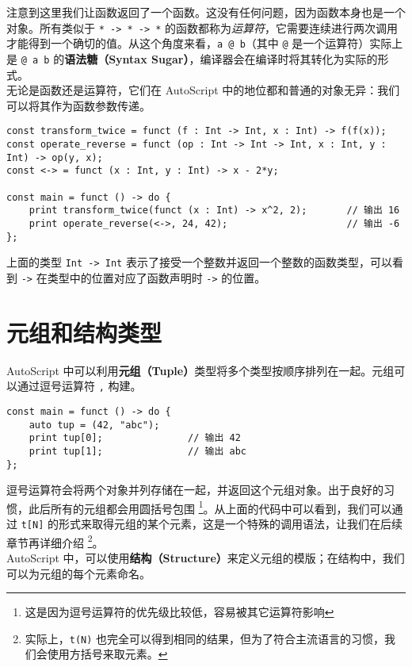 注意到这里我们让函数返回了一个函数。这没有任何问题，因为函数本身也是一个对象。所有类似于 \lstinline!* -> * -> *! 的函数都称为\emph{运算符}，它需要连续进行两次调用才能得到一个确切的值。从这个角度来看，\lstinline!a @ b!（其中 \lstinline!@! 是一个运算符）实际上是 \lstinline!@ a b! 的\textbf{语法糖（Syntax Sugar）}，编译器会在编译时将其转化为实际的形式。  \\

无论是函数还是运算符，它们在 AutoScript 中的地位都和普通的对象无异：我们可以将其作为函数参数传递。

\begin{lstlisting}
const transform_twice = funct (f : Int -> Int, x : Int) -> f(f(x));
const operate_reverse = funct (op : Int -> Int -> Int, x : Int, y : Int) -> op(y, x);
const <-> = funct (x : Int, y : Int) -> x - 2*y;

const main = funct () -> do {
	print transform_twice(funct (x : Int) -> x^2, 2);		// 输出 16
	print operate_reverse(<->, 24, 42);						// 输出 -6
};
\end{lstlisting}

上面的类型 \lstinline!Int -> Int! 表示了接受一个整数并返回一个整数的函数类型，可以看到 \lstinline!->! 在类型中的位置对应了函数声明时 \lstinline!->! 的位置。


\section{元组和结构类型}

AutoScript 中可以利用\textbf{元组（Tuple）}类型将多个类型按顺序排列在一起。元组可以通过逗号运算符 \lstinline!,! 构建。

\begin{lstlisting}
const main = funct () -> do {
    auto tup = (42, "abc");
    print tup[0];				// 输出 42
    print tup[1];				// 输出 abc
};
\end{lstlisting}

逗号运算符会将两个对象并列存储在一起，并返回这个元组对象。出于良好的习惯，此后所有的元组都会用圆括号包围 \footnote{这是因为逗号运算符的优先级比较低，容易被其它运算符影响}。从上面的代码中可以看到，我们可以通过 \lstinline!t[N]! 的形式来取得元组的某个元素，这是一个特殊的调用语法，让我们在后续章节再详细介绍 \footnote{实际上，\lstinline!t(N)! 也完全可以得到相同的结果，但为了符合主流语言的习惯，我们会使用方括号来取元素。}。 \\

AutoScript 中，可以使用\textbf{结构（Structure）}来定义元组的模版；在结构中，我们可以为元组的每个元素命名。

